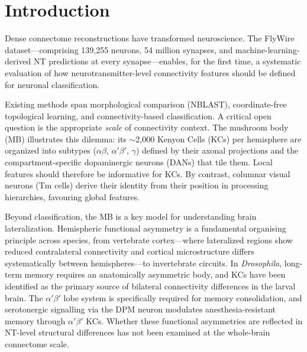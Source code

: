 \documentclass[10pt]{article}
\begin{document}
\vspace{1em}

\section*{Introduction}

Dense connectome reconstructions have transformed neuroscience\cite{scheffer2020hemibrain,dorkenwald2024flywire,schlegel2024flywire}. The FlyWire dataset---comprising 139,255 neurons, 54 million synapses, and machine-learning-derived NT predictions at every synapse\cite{eckstein2020neurotransmitter}---enables, for the first time, a systematic evaluation of how neurotransmitter-level connectivity features should be defined for neuronal classification.

Existing methods span morphological comparison (NBLAST\cite{costa2016nblast}), coordinate-free topological learning\cite{li2023gnn_neuro}, and connectivity-based classification\cite{li2020kc_subtypes}. A critical open question is the appropriate \textit{scale} of connectivity context. The mushroom body (MB) illustrates this dilemma: its $\sim$2,000 Kenyon Cells (KCs) per hemisphere are organized into subtypes ($\alpha\beta$, $\alpha'\beta'$, $\gamma$) defined by their axonal projections and the compartment-specific dopaminergic neurons (DANs) that tile them\cite{aso2014mushroom,modi2020dopamine_kc}. Local features should therefore be informative for KCs. By contrast, columnar visual neurons (Tm cells) derive their identity from their position in processing hierarchies\cite{takemura2013visual,shinomiya2019tm}, favouring global features.

Beyond classification, the MB is a key model for understanding brain lateralization. Hemispheric functional asymmetry is a fundamental organising principle across species, from vertebrate cortex---where lateralized regions show reduced contralateral connectivity\cite{karolis2019lateralisation} and cortical microstructure differs systematically between hemispheres\cite{wan2024microstructural}---to invertebrate circuits. In \textit{Drosophila}, long-term memory requires an anatomically asymmetric body\cite{pascual2004lateralized}, and KCs have been identified as the primary source of bilateral connectivity differences in the larval brain\cite{pedigo2023bilateral_elife,winding2023larva}. The $\alpha'\beta'$ lobe system is specifically required for memory consolidation\cite{krashes2007sequential}, and serotonergic signalling via the DPM neuron modulates anesthesia-resistant memory through $\alpha'\beta'$ KCs\cite{keene2006dpm,waddell2013serotonin}. Whether these functional asymmetries are reflected in NT-level structural differences has not been examined at the whole-brain connectome scale.
\end{document}
